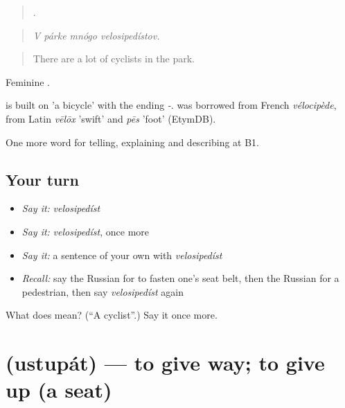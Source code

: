 \begin{quote}
   .
\end{quote}

\begin{quote}
\emph{V párke mnógo velosipedístov.}
\end{quote}

\begin{quote}
There are a lot of cyclists in the park.
\end{quote}

Feminine \emph{}.

\begin{cousinweb}
\emph{} is built on \emph{} 'a bicycle' with the ending \emph{-}. \emph{} was borrowed from French \emph{vélocipède}, from Latin \emph{vēlōx} 'swift' and \emph{pēs} 'foot' (EtymDB).
\end{cousinweb}

\begin{grammarlens}[title={What you've built}]
One more word for telling, explaining and describing at B1.
\end{grammarlens}

\subsection*{Your turn}
\begin{itemize}
\raggedright
  \item \emph{Say it:} \emph{velosipedíst}
  \item \emph{Say it:} \emph{velosipedíst}, once more
  \item \emph{Say it:} a sentence of your own with \emph{velosipedíst}
  \item \emph{Recall:} say the Russian for to fasten one's seat belt, then the Russian for a pedestrian, then say \emph{velosipedíst} again
\end{itemize}

\begin{tcolorbox}[breakable,colback=teal!4,colframe=teal!35!black,title={Before you move on}]
What does  mean? (\textquotedblleft{}A cyclist\textquotedblright{}.) Say it once more.
\end{tcolorbox}
\section[\texorpdfstring{\ru{уступать} (ustupát)}{уступать (ustupát)}]{ (ustupát) — to give way; to give up (a seat)}

